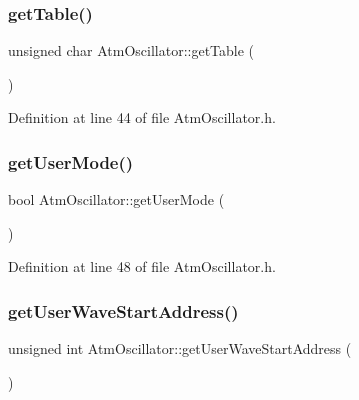 \subsubsection{\texorpdfstring{get\+Table()}{getTable()}}
{\footnotesize\ttfamily unsigned char Atm\+Oscillator\+::get\+Table (\begin{DoxyParamCaption}{ }\end{DoxyParamCaption})\hspace{0.3cm}{\ttfamily [inline]}}



Definition at line 44 of file Atm\+Oscillator.\+h.

\mbox{\label{class_atm_oscillator_a21a4425606aa28eabf47a28ea7f02c9a}} 
\subsubsection{\texorpdfstring{get\+User\+Mode()}{getUserMode()}}
{\footnotesize\ttfamily bool Atm\+Oscillator\+::get\+User\+Mode (\begin{DoxyParamCaption}{ }\end{DoxyParamCaption})\hspace{0.3cm}{\ttfamily [inline]}}



Definition at line 48 of file Atm\+Oscillator.\+h.

\mbox{\label{class_atm_oscillator_a19bdaa400d57eeb24ca027febc2fd1cf}} 
\subsubsection{\texorpdfstring{get\+User\+Wave\+Start\+Address()}{getUserWaveStartAddress()}}
{\footnotesize\ttfamily unsigned int Atm\+Oscillator\+::get\+User\+Wave\+Start\+Address (\begin{DoxyParamCaption}{ }\end{DoxyParamCaption})\hspace{0.3cm}{\ttfamily [inline]}}



